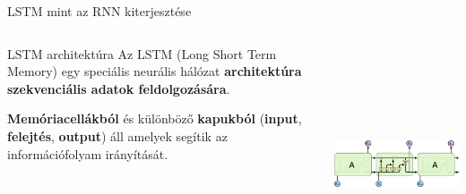 \documentclass[english, aspectratio=169]{beamer}
\begin{document}
\begin{frame}{LSTM mint az RNN kiterjesztése}
\begin{columns}
\begin{column}{.35\textwidth}
\begin{block}{LSTM architektúra}
Az LSTM (Long Short Term Memory) egy speciális neurális hálózat \textbf{architektúra szekvenciális adatok feldolgozására}.\par\smallskip
\textbf{Memóriacellákból} és különböző \textbf{kapukból} (\textbf{input}, \textbf{felejtés}, \textbf{output}) áll amelyek segítik az információfolyam irányítását.  
\end{block}
\end{column}
\begin{column}{.65\textwidth}
\begin{center}
\includegraphics[height=7cm, width=9.5cm, keepaspectratio]{images/recurrent_6.png}
\end{center}
\end{column}
\end{columns}
\end{frame}
\end{document}

